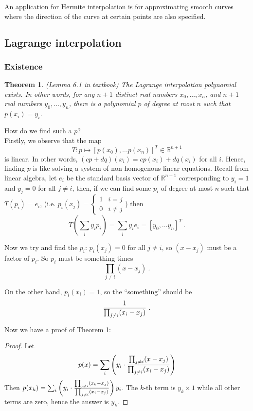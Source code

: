 \documentclass[20pt]{article} %
\theoremstyle{break}
\newtheorem{thm}[definition]{Theorem}
\begin{document}
  An application for Hermite interpolation is for approximating smooth curves where the direction of the curve at certain points are also specified.

  \newpage
  
  \subsection{Lagrange interpolation}
  \subsubsection{Existence}
  \begin{thm}\label{ext_lag} (Lemma 6.1 in textbook) The Lagrange interpolation polynomial exists. In other words, for any $n+1$ distinct real numbers $x_0,\dots, x_n$, and $n+1$ real numbers $y_0, \dots, y_n$, there is a polynomial $p$ of degree at most $n$ such that $p(x_i)=y_i$.
  \end{thm}
  How do we find such a $p$?\\
  
  Firstly, we observe that the map
  \[T: p\mapsto [p(x_0), \dots p(x_n)]^T\in \mathbb{R}^{n+1}\]
  is linear. In other words, $(cp+dq)(x_i)=cp(x_i)+dq(x_i)$ for all $i$.
  Hence, finding $p$ is like solving a system of non homogenous linear equations. Recall from linear algebra, let $e_i$ be the standard basis vector of $\mathbb{R}^{n+1}$ corresponding to $y_i=1$ and $y_j=0$ for all $j\not=i$, then, if we can find some $p_i$ of degree at most $n$ such that $T(p_i)=e_i$, (i.e. $p_i(x_j)=\begin{cases} 1 & i=j\\ 0 &i\not=j\end{cases}$)  then
  \[T(\sum_iy_ip_i)=\sum_iy_ie_i=[y_0, \dots y_n]^T\ .\]

  \newpage
  
  Now we try and find the $p_i$: $p_i(x_j)=0$ for all $j\not=i$, so $(x-x_j)$ must be a factor of $p_i$. So $p_i$ must be something times
  \[\prod_{j\not=i}(x-x_j)\ .\]

  On the other hand, $p_i(x_i)=1$, so the ``something'' should be
  \[{1\over\prod_{j\not=i}(x_i-x_j)}\ .\]

  Now we have a proof of Theorem 1:

  \begin{proof}
    Let
    \[p(x)=\sum_i\left( y_i\cdot {\prod_{j\not=i}(x-x_j)\over \prod_{j\not=i}(x_i-x_j)}\right)\]
    Then $p(x_k)=\sum_i\left( y_i\cdot {\prod_{j\not=i}(x_k-x_j)\over \prod_{j\not=i}(x_i-x_j)}\right)y_i$. The $k$-th term is $y_k\times 1$ while all other terms are zero, hence the answer is $y_k$.
  \end{proof}
\end{document}

